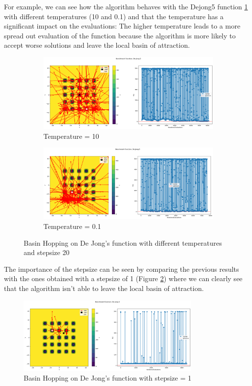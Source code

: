 For example, we can see how the algorithm behaves with the Dejong5 function \ref{fig:bh-dejong} with different temperatures (10 and 0.1) and that the temperature has a significant impact on the evaluations: The higher temperature leads to a more spread out evaluation of the function because the algorithm is more likely to accept worse solutions and leave the local basin of attraction.
\begin{figure}[H]
    \begin{subfigure}{0.5\textwidth}
        \includegraphics[width=\textwidth]{lab2/imgs/bh_dejong_10.png}
        \caption{Temperature = 10}
    \end{subfigure}
    \begin{subfigure}{0.5\textwidth}
        \includegraphics[width=\textwidth]{lab2/imgs/bh_dejong_01.png}
        \caption{Temperature = 0.1}
    \end{subfigure}
    \caption{Basin Hopping on De Jong's function with different temperatures and stepsize 20}
    \label{fig:bh-dejong}
\end{figure}
The importance of the stepsize can be seen by comparing the previous results with the ones obtained with a stepsize of 1 (Figure \ref{fig:bh-dejong-stepsize}) where we can clearly see that the algorithm isn't able to leave the local basin of attraction.
\begin{figure}[H]
    \centering
    \includegraphics[width=0.8\textwidth]{lab2/imgs/bh_dejong_step_1.png}
    \caption{Basin Hopping on De Jong's function with stepsize = 1}
    \label{fig:bh-dejong-stepsize}
\end{figure}

